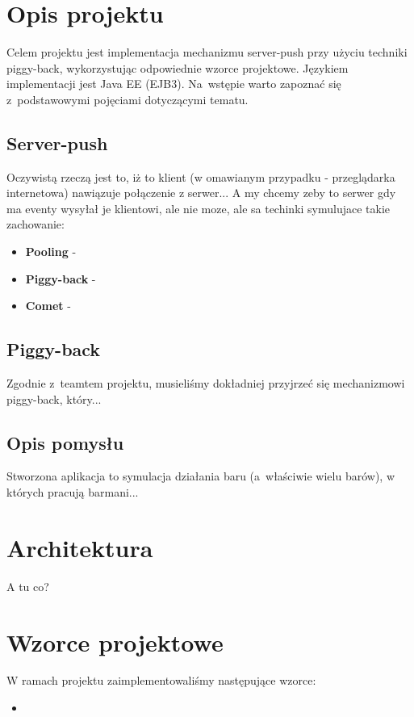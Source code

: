 \documentclass[11pt]{aghdpl}
\author{Wojciech Kasperek, Agnieszka Maksylewicz,}
\date{2014/2015}
\begin{document}
\titlepages
\vspace*{-20mm}
\tableofcontents
\clearpage

\chapter{Opis projektu}
Celem projektu jest implementacja mechanizmu server-push przy użyciu techniki piggy-back, wykorzystując odpowiednie wzorce projektowe. Językiem implementacji jest Java EE (EJB3). Na~wstępie warto zapoznać się z~podstawowymi pojęciami dotyczącymi tematu.


\section{Server-push}
Oczywistą rzeczą jest to, iż to klient (w omawianym przypadku - przeglądarka internetowa) nawiązuje połączenie z serwer...
A my chcemy zeby to serwer gdy ma eventy wysyłał je klientowi, ale nie moze, ale sa techinki symulujace takie zachowanie:

\begin{itemize}
 \item \textbf{Pooling} -  
 \item \textbf{Piggy-back} - 
 \item \textbf{Comet} -
\end{itemize}

\section{Piggy-back}
Zgodnie z~teamtem projektu, musieliśmy dokładniej przyjrzeć się mechanizmowi piggy-back, który...

\section{Opis pomysłu}
Stworzona aplikacja to symulacja działania baru (a~właściwie wielu barów), w których pracują barmani...

\chapter{Architektura}
A tu co?

\chapter{Wzorce projektowe}
W ramach projektu zaimplementowaliśmy następujące wzorce:

\begin{itemize}
 \item 
\end{itemize}
\end{document}
